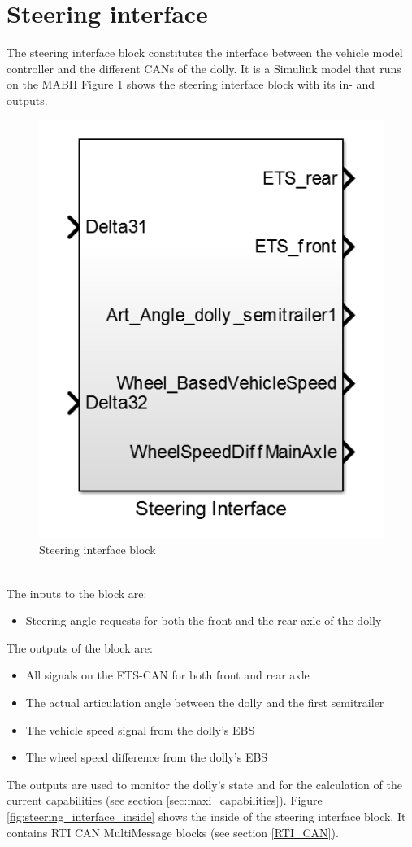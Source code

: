 \documentclass[ExampleMasters.tex]{subfiles}
\begin{document}
\section{Steering interface}
\label{sec:steering_interface}
The steering interface block constitutes the interface between the vehicle model controller and the different \gls{CAN}s of the dolly. It is a Simulink model that runs on the \gls{MABII}
Figure \ref{fig:steering_interface} shows the steering interface block with its in- and outputs. 
\begin{figure}[h]
	\centering
	\includegraphics[width=0.5\linewidth]{figures/steering_interface}
	
	\caption{Steering interface block}
	\label{fig:steering_interface}
\end{figure} \\
The inputs to the block are:
\begin{itemize}
	\item Steering angle requests for both the front and  the rear axle of the dolly 
\end{itemize} 
 The outputs of the block are:
 \begin{itemize}
 	\item All signals on the \gls{ETS}-\gls{CAN} for both front and rear axle
 	\item The actual articulation angle between the dolly and the first semitrailer
 	\item The vehicle speed signal from the dolly's \gls{EBS}
 	\item The wheel speed difference from the dolly's \gls{EBS}
 \end{itemize}
 The outputs are used to monitor the dolly's state and for the calculation of the current capabilities (see section \ref{sec:maxi_capabilities}).
 Figure \ref{fig:steering_interface_inside} shows the inside of the steering interface block. It contains \gls{RTI} \gls{CAN} MultiMessage blocks (see section \ref{RTI_CAN}).   
 
\end{document}

